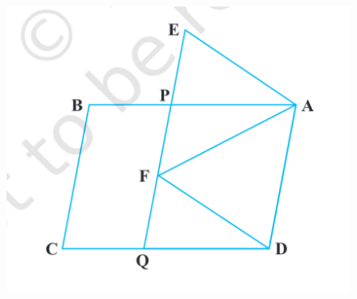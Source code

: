 \documentclass[12pt]{article}
\begin{document}
\begin{enumerate}
\begin{figure}[h]
	\includegraphics[width=\columnwidth]{Figs/Fig9.27.png}
	\caption{}
	\label{fig:9.27}
\end{figure}
\end{enumerate}
\end{document}
